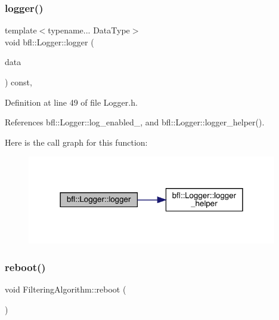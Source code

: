 \subsubsection{\texorpdfstring{logger()}{logger()}\hspace{0.1cm}{\footnotesize\ttfamily [4/4]}}
{\footnotesize\ttfamily template$<$typename... Data\+Type$>$ \\
void bfl\+::\+Logger\+::logger (\begin{DoxyParamCaption}\item[{Data\+Type...}]{data }\end{DoxyParamCaption}) const\hspace{0.3cm}{\ttfamily [inline]}, {\ttfamily [inherited]}}



Definition at line 49 of file Logger.\+h.



References bfl\+::\+Logger\+::log\+\_\+enabled\+\_\+, and bfl\+::\+Logger\+::logger\+\_\+helper().

Here is the call graph for this function\+:
\nopagebreak
\begin{figure}[H]
\begin{center}
\leavevmode
\includegraphics[width=309pt]{classbfl_1_1Logger_a0f0cf7ce956546d94dfb1feb7cebf171_cgraph}
\end{center}
\end{figure}
\mbox{\label{classbfl_1_1FilteringAlgorithm_a6022859aa985474fb997343cc935b11e}} 
\subsubsection{\texorpdfstring{reboot()}{reboot()}}
{\footnotesize\ttfamily void Filtering\+Algorithm\+::reboot (\begin{DoxyParamCaption}{ }\end{DoxyParamCaption})\hspace{0.3cm}{\ttfamily [inherited]}}



